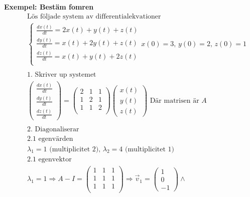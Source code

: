\textbf{Exempel: Bestäm fomren}
\begin{align*}
  &\quad  \text{Lös följade system av differentialekvationer} \\
  &\quad
  \left\{\begin{array}{rrr}
  \frac{dx(t)}{dt} = 2x(t) + y(t) + z(t) \\
  \frac{dy(t)}{dt} =  x(t) +2y(t) + z(t) \\
  \frac{dz(t)}{dt} =  x(t) + y(t) +2z(t) \\
  \end{array}\right. x (0) =3, \, y (0) =2, \, z (0) =1  \\
  &\quad  \\
  &\quad  \text{1. Skriver up systemet} \\
  &\quad
  \begin{pmatrix} \frac{dx (t)}{dt} \\ \frac{dy (t)}{dt} \\ \frac{dz (t)}{dt} \end{pmatrix} =
  \left(\begin{array}{ccc}
    2 & 1 & 1 \\
    1 & 2 & 1 \\
    1 & 1 & 2 \\
  \end{array}\right)
  \begin{pmatrix} x (t) \\ y (t) \\ z (t)  \end{pmatrix}  \text{ Där matrisen är $A$} \\
  &\quad  \\
  &\quad  \text{2. Diagonaliserar} \\
  &\quad  \text{2.1 egenvärden} \\
  &\quad  \lambda_1 = 1 \text{ (multiplicitet 2), } \lambda_2 = 4 \text{ (multiplicitet 1) } \\
  &\quad  \text{2.1 egenvektor} \\
  &\quad  \lambda_1 = 1 \Rightarrow{}  A -I =
  \left(\begin{array}{ccc}
    1 & 1 & 1 \\
    1 & 1 & 1 \\
    1 & 1 & 1 \\
  \end{array}\right)  \Rightarrow{}
  \vec{v}_1 = \begin{pmatrix} 1 \\ 0 \\ -1  \end{pmatrix} \land{}

\end{align*}
